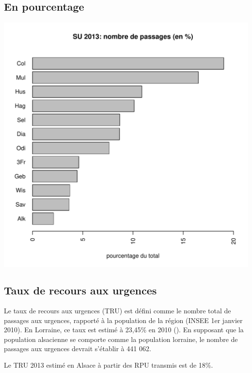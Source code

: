 \documentclass[12pt,english,french,twoside]{book}\usepackage[]{graphicx}\usepackage[]{color}
\makeatletter
\def\maxwidth{ %
  \ifdim\Gin@nat@width>\linewidth
    \linewidth
  \else
    \Gin@nat@width
  \fi
}
\newenvironment{knitrout}{}{} %
\makeatother
\begin{document}
\subsection*{En pourcentage}

\begin{knitrout}
\color{fgcolor}
\includegraphics[width=\maxwidth]{figure/en_pourcentage} 

\end{knitrout}


\subsection*{Taux de recours aux urgences}



Le taux de recours aux urgences  (TRU)  est défini comme le nombre total de passages aux urgences, rapporté à la population de la région (INSEE 1er janvier 2010). En Lorraine, ce taux est estimé à 23,45\% en 2010 (\cite{2,3}). En supposant que la population alsacienne se comporte comme la population lorraine, le nombre de passages aux urgences devrait s'établir à 441 062.

Le TRU 2013 estimé en Alsace à partir des RPU transmis est de 18\%.
\end{document}
